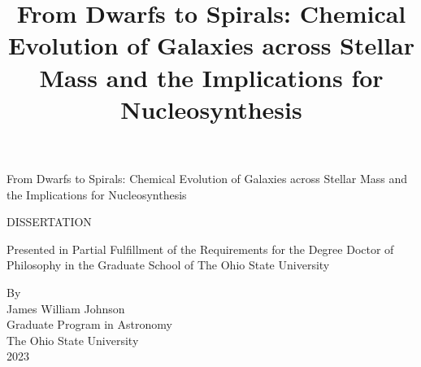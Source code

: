%
%
%
%
%
%

\begin{titlepage}

%
%


\begin{center}
\begin{singlespace}
\vspace*{1.3cm}
{\Large
From Dwarfs to Spirals: Chemical Evolution of Galaxies across Stellar Mass and
the Implications for Nucleosynthesis
}
\end{singlespace}

\title{From Dwarfs to Spirals: Chemical Evolution of Galaxies across Stellar
Mass and the Implications for Nucleosynthesis}

%
%
%
%
%

\vspace*{1.5cm}

DISSERTATION\\
\vspace*{1.5cm}
\begin{singlespace}
Presented in Partial Fulfillment of the Requirements for
the Degree Doctor of Philosophy in the Graduate School of The Ohio 
State University\\
\end{singlespace}
\vspace*{1.0cm}


%
%
%
\begin{doublespace}
By
\\
James William Johnson
\\
Graduate Program in Astronomy
\\
\vspace*{1.0cm}
The Ohio State University\\
2023\\


\end{doublespace}
\end{center}
\end{titlepage}
